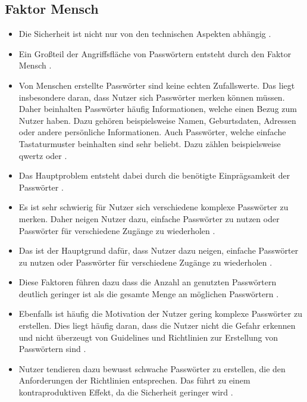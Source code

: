 \subsection{Faktor Mensch}

\begin{itemize}
    \item Die Sicherheit ist nicht nur von den technischen Aspekten abhängig \cite{ives2004domino}.
    \item Ein Großteil der Angriffsfläche von Passwörtern entsteht durch den Faktor Mensch \cite{yildirim2019encouraging}.
    \item Von Menschen erstellte Passwörter sind keine echten Zufallswerte. Das liegt insbesondere daran, dass Nutzer sich Passwörter merken können müssen. Daher beinhalten Passwörter häufig Informationen, welche einen Bezug zum Nutzer haben. Dazu gehören beispielsweise Namen, Geburtsdaten, Adressen oder andere persönliche Informationen. Auch Passwörter, welche einfache Tastaturmuster beinhalten sind sehr beliebt. Dazu zählen beispielsweise \glqq qwertz\grqq{} oder \grqq{} \cite{chanda2016password} \cite{boonkrong2012security} \cite{yildirim2019encouraging}.
    \item Das Hauptproblem entsteht dabei durch die benötigte Einprägsamkeit der Passwörter \cite{yildirim2019encouraging}.
    \item Es ist sehr schwierig für Nutzer sich verschiedene komplexe Passwörter zu merken. Daher neigen Nutzer dazu, einfache Passwörter zu nutzen oder Passwörter für verschiedene Zugänge zu wiederholen \cite{chanda2016password}.
    \item Das ist der Hauptgrund dafür, dass Nutzer dazu neigen, einfache Passwörter zu nutzen oder Passwörter für verschiedene Zugänge zu wiederholen \cite{yildirim2019encouraging}.
    \item Diese Faktoren führen dazu dass die Anzahl an genutzten Passwörtern deutlich geringer ist als die gesamte Menge an möglichen Passwörtern \cite{boonkrong2012security}.
    \item Ebenfalls ist häufig die Motivation der Nutzer gering komplexe Passwörter zu erstellen. Dies liegt häufig daran, dass die Nutzer nicht die Gefahr erkennen und nicht überzeugt von Guidelines und Richtlinien zur Erstellung von Passwörtern sind \cite{yildirim2019encouraging}.
    \item Nutzer tendieren dazu bewusst schwache Passwörter zu erstellen, die den Anforderungen der Richtlinien entsprechen. Das führt zu einem kontraproduktiven Effekt, da die Sicherheit geringer wird \cite{yildirim2019encouraging}.

\end{itemize}
